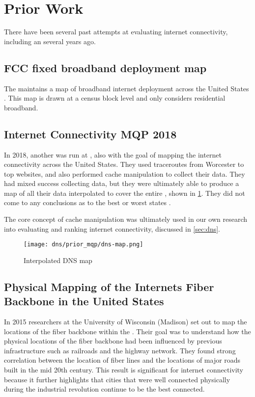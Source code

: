 \section{Prior Work}\label{sec:background_prior_work}

There have been several past attempts at evaluating \us internet connectivity, including an \mqp several years ago.

\subsection{FCC fixed broadband deployment map}
The \FCC maintains a map of broadband internet deployment across the United States \cite{FederalCommunicationsCommission}. This map is drawn at a census block level and only considers residential broadband.
 
 \subsection{Internet Connectivity MQP 2018}
In 2018, another \mqp was run at \wpi, also with the goal of mapping the internet connectivity across the United States. They used traceroutes from Worcester to top websites, and also performed \dns cache manipulation to collect their data. They had mixed success collecting data, but they were ultimately able to produce a map of all their \dns data interpolated to cover the entire \us, shown in \cref{fig:interpolated_dns_map}. They did not come to any conclusions as to the best or worst states \cite{Fakult2019}.

The core concept of \dns cache manipulation was ultimately used in our own research into evaluating and ranking internet connectivity, discussed in \cref{sec:dns}.

\begin{figure}[h]
    \centering
    \texttt{[image: dns/prior\_mqp/dns-map.png]}
    \caption{Interpolated DNS map}
    \label{fig:interpolated_dns_map}
\end{figure}
 
\subsection{Physical Mapping of the Internets Fiber Backbone in the United States}
In 2015 researchers at the University of Wisconsin (Madison) set out to map the locations of the fiber backbone within the \us.  Their goal was to understand how the physical locations of the fiber backbone had been influenced by previous infrastructure such as railroads and the highway network. They found strong correlation between the location of fiber lines and the locations of major roads built in the mid 20th century. This result is significant for internet connectivity because it further highlights that cities that were well connected physically during the industrial revolution continue to be the best connected.
 